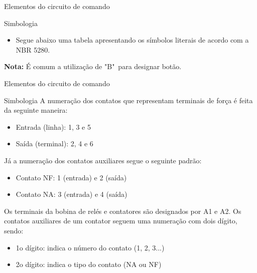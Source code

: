 \begin{frame}{Elementos do circuito de comando}
\begin{block}{Simbologia}
	\begin{itemize}
		\item Segue abaixo uma tabela apresentando os símbolos literais de acordo com a NBR 5280.
	\end{itemize}
	 \textbf{Nota:} É comum a utilização de "B"~para designar botão.
\end{block}
\begin{table}[h]
\end{table}
\end{frame}


\begin{frame}{Elementos do circuito de comando}
\begin{block}{Simbologia}
	A numeração dos contatos que representam terminais de força é feita da seguinte maneira:
	\begin{itemize}
		\item Entrada (linha): 1, 3 e 5
		\item Saída (terminal): 2, 4 e 6
	\end{itemize}
	Já a numeração dos contatos auxiliares segue o seguinte padrão:
	\begin{itemize}
		\item Contato NF: 1 (entrada) e 2 (saída)
		\item Contato NA: 3 (entrada) e 4 (saída)
	\end{itemize}
	Os terminais da bobina de relés e contatores são designados por A1 e A2. Os contatos auxiliares de um contator seguem uma numeração com dois dígito, sendo:
	\begin{itemize}
		\item 1o dígito: indica o número do contato (1, 2, 3...)
		\item 2o dígito: indica o tipo do contato (NA ou NF)
	\end{itemize}
\end{block}
\end{frame}


